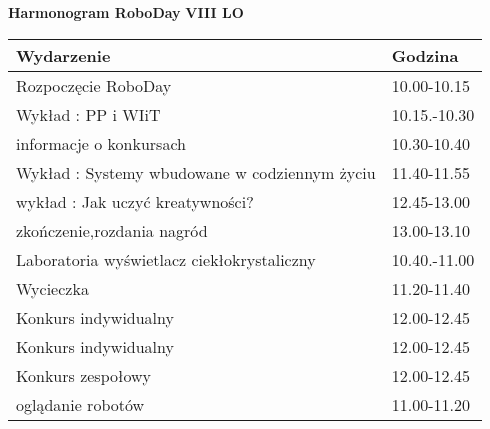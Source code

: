 \documentclass{article}
\begin{document}
\begin{center}
\Large\textbf{Harmonogram RoboDay}
\large\textbf{VIII LO}
\end{center}
\vspace{1cm}
\begin{center}
\begin{tabular}{|l|l|}
\hline
\textbf{Wydarzenie} & \textbf{Godzina} \\
\hline
Rozpoczęcie RoboDay & 10.00-10.15 \\
\hline
Wykład : PP i WIiT & 10.15.-10.30 \\
\hline
informacje o konkursach & 10.30-10.40 \\
\hline
Wykład : Systemy wbudowane w codziennym życiu & 11.40-11.55 \\
\hline
wykład : Jak uczyć kreatywności? & 12.45-13.00 \\
\hline
zkończenie,rozdania nagród & 13.00-13.10 \\
\hline
Laboratoria wyświetlacz ciekłokrystaliczny & 10.40.-11.00 \\
\hline
Wycieczka & 11.20-11.40 \\
\hline
Konkurs indywidualny & 12.00-12.45 \\
\hline
Konkurs indywidualny & 12.00-12.45 \\
\hline
Konkurs zespołowy & 12.00-12.45 \\
\hline
oglądanie robotów & 11.00-11.20 \\
\hline
\end{tabular}
\end{center}
\end{document}
